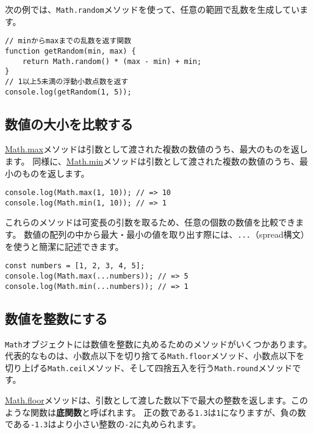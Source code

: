 次の例では、\texttt{Math.random}メソッドを使って、任意の範囲で乱数を生成しています。

\begin{lstlisting}
// minからmaxまでの乱数を返す関数
function getRandom(min, max) {
    return Math.random() * (max - min) + min;
}
// 1以上5未満の浮動小数点数を返す
console.log(getRandom(1, 5));
\end{lstlisting}

\hypertarget{compare-number}{%
\subsection{数値の大小を比較する}\label{compare-number}}

\href{https://developer.mozilla.org/ja/docs/Web/JavaScript/Reference/Global_Objects/Math/max}{Math.max}メソッドは引数として渡された複数の数値のうち、最大のものを返します。
同様に、\href{https://developer.mozilla.org/ja/docs/Web/JavaScript/Reference/Global_Objects/Math/min}{Math.min}メソッドは引数として渡された複数の数値のうち、最小のものを返します。

\begin{lstlisting}
console.log(Math.max(1, 10)); // => 10
console.log(Math.min(1, 10)); // => 1
\end{lstlisting}

これらのメソッドは可変長の引数を取るため、任意の個数の数値を比較できます。
数値の配列の中から最大・最小の値を取り出す際には、\texttt{...}（spread構文）を使うと簡潔に記述できます。

\begin{lstlisting}
const numbers = [1, 2, 3, 4, 5];
console.log(Math.max(...numbers)); // => 5
console.log(Math.min(...numbers)); // => 1
\end{lstlisting}

\hypertarget{convert-to-integer}{%
\subsection{数値を整数にする}\label{convert-to-integer}}

\texttt{Math}オブジェクトには数値を整数に丸めるためのメソッドがいくつかあります。
代表的なものは、小数点以下を切り捨てる\texttt{Math.floor}メソッド、小数点以下を切り上げる\texttt{Math.ceil}メソッド、そして四捨五入を行う\texttt{Math.round}メソッドです。

\href{https://developer.mozilla.org/ja/docs/Web/JavaScript/Reference/Global_Objects/Math/floor}{Math.floor}メソッドは、引数として渡した数以下で最大の整数を返します。このような関数は\textbf{底関数}と呼ばれます。
正の数である\texttt{1.3}は\texttt{1}になりますが、負の数である\texttt{-1.3}はより小さい整数の\texttt{-2}に丸められます。


